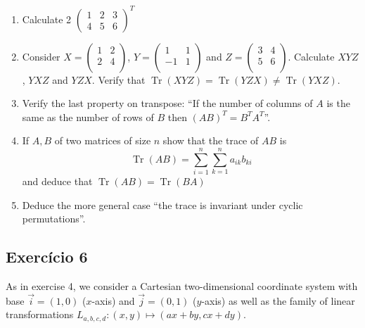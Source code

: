 \begin{enumerate}

\item Calculate
  2 ${\begin{pmatrix}
      1 & 2 & 3 \\
      4 & 5 & 6
      \end{pmatrix}
      }^T$
\item Consider $X = \begin{pmatrix}
          1 & 2 \\
          2 & 4 \\
        \end{pmatrix}$, $Y = \begin{pmatrix}
          1 & 1 \\
          -1 & 1 \\
        \end{pmatrix}$ and $Z = \begin{pmatrix}
          3 & 4 \\
          5 & 6 \\
\end{pmatrix}$.
  Calculate $XYZ$, $YXZ$ and $YZX$. Verify that
  $\operatorname{Tr}(XYZ) = \operatorname{Tr}(YZX) \neq \operatorname{Tr}(YXZ)$.

\item Verify the last property on transpose:
  ``If the number of columns of $A$  is the same as the number
  of rows of $B$ then ${(A B)}^T = B^T A^T$''.
\item If $A,B$ of two matrices of size $n$ show that
  the trace of $AB$ is
      $$
    \operatorname{Tr}(A B) =
    \sum_{i=1}^n \sum_{k=1}^n a_{i k} b_{k i}
    $$
  and deduce that $\operatorname{Tr}(A B) = \operatorname{Tr}(B A)$
\item Deduce the more general case ``the trace is invariant under cyclic
  permutations''.
\end{enumerate}

\subsection*{Exercício 6}

As in exercise 4, we consider a Cartesian two-dimensional coordinate system
with base $\vec{i}=(1,0)$ ($x$-axis) and $\vec{j}=(0,1)$ ($y$-axis) as
well as the family of linear transformations
$L_{a,b,c,d}: (x,y) \mapsto ({ax+by},{cx+dy})$.

